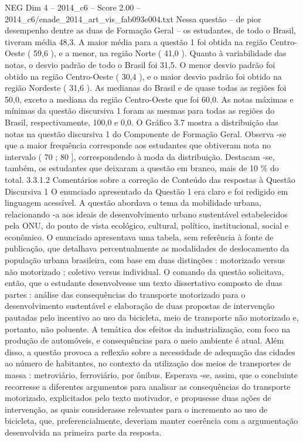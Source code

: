 \begin{textsample}{NEG Dim 4 – 2014\_c6 – Score 2.00 – 2014\_c6/enade\_2014\_art\_vis\_fab093e004.txt}
Nessa questão – de pior desempenho dentre as duas de Formação Geral – os estudantes, de todo o Brasil, tiveram média 48,3.
A maior média para a questão 1 foi obtida na região Centro-Oeste ( 59,6 ), e a menor, na região Norte ( 41,0 ).
Quanto à variabilidade das notas, o desvio padrão de todo o Brasil foi 31,5.
O menor desvio padrão foi obtido na região Centro-Oeste ( 30,4 ), e o maior desvio padrão foi obtido na região Nordeste ( 31,6 ).
As medianas do Brasil e de quase todas as regiões foi 50,0, exceto a mediana da região Centro-Oeste que foi 60,0.
As notas máximas e mínimas da questão discursiva 1 foram as mesmas para todas as regiões do Brasil, respectivamente, 100,0 e 0,0.
O Gráfico 3.7 mostra a distribuição das notas na questão discursiva 1 do Componente de Formação Geral.
Observa -se que a maior frequência corresponde aos estudantes que obtiveram nota no intervalo ( 70 ; 80 ], correspondendo à moda da distribuição.
Destacam -se, também, os estudantes que deixaram a questão em branco, mais de 10 \% do total. 3.3.1.2 Comentários sobre a correção de Conteúdo das respostas à Questão Discursiva 1 O enunciado apresentado da Questão 1 era claro e foi redigido em linguagem acessível.
A questão abordava o tema da mobilidade urbana, relacionando -a aos ideais de desenvolvimento urbano sustentável estabelecidos pela ONU, do ponto de vista ecológico, cultural, político, institucional, social e econômico.
O enunciado apresentava uma tabela, sem referência à fonte de publicação, que detalhava percentualmente as modalidades de deslocamento da população urbana brasileira, com base em duas distinções : motorizado versus não motorizado ; coletivo versus individual.
O comando da questão solicitava, então, que o estudante desenvolvesse um texto dissertativo composto de duas partes : análise das consequências do transporte motorizado para o desenvolvimento sustentável e elaboração de duas propostas de intervenção pautadas pelo incentivo ao uso da bicicleta, meio de transporte não motorizado e, portanto, não poluente.
A temática dos efeitos da industrialização, com foco na produção de automóveis, e consequências para o meio ambiente é atual.
Além disso, a questão provoca a reflexão sobre a necessidade de adequação das cidades ao número de habitantes, no contexto da utilização dos meios de transportes de massa : metroviário, ferroviário, por ônibus.
Esperava -se, assim, que o concluinte recorresse a diferentes argumentos para analisar as consequências do transporte motorizado, explicitados pelo texto motivador, e propusesse duas ações de intervenção, as quais considerasse relevantes para o incremento ao uso de bicicleta, que, preferencialmente, deveriam manter coerência com a argumentação desenvolvida na primeira parte da resposta.

\end{textsample}

